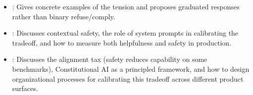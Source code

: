 \begin{interviewq}

\goodgreat
\begin{itemize}
    \item {}: Gives concrete examples of the tension and proposes
    graduated responses rather than binary refuse/comply.
    \item {}: Discusses contextual safety, the role of system
    prompts in calibrating the tradeoff, and how to measure both helpfulness
    and safety in production.
    \item {}: Discusses the alignment tax (safety reduces
    capability on some benchmarks), Constitutional AI as a principled framework,
    and how to design organizational processes for calibrating this tradeoff
    across different product surfaces.
\end{itemize}

\end{interviewq}

\vspace{0.5em}

